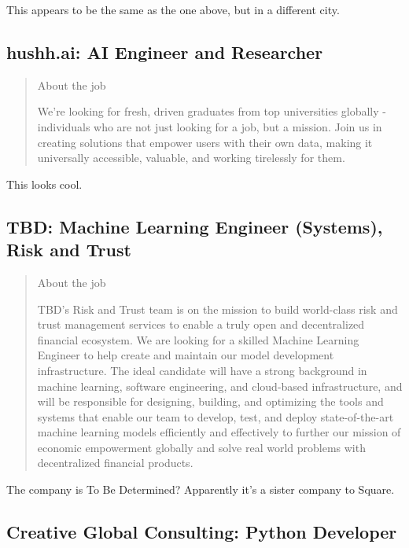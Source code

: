 \documentclass[
	letterpaper, %
	12pt, %
]{CSSullivanBusinessReport}
\begin{document}
This appears to be the same as the one above, but in a different city. 


\subsection[hushh.ai]{hushh.ai: AI Engineer and Researcher}

\begin{quote}
	About the job
	
	We're looking for fresh, driven graduates from top universities globally - individuals who are not just looking for a job, but a mission. Join us in creating solutions that empower users with their own data, making it universally accessible, valuable, and working tirelessly for them.

\end{quote}

This looks cool.


\subsection[TBD]{TBD: Machine Learning Engineer (Systems), Risk and Trust}

\begin{quote}
	About the job
	
	TBD's Risk and Trust team is on the mission to build world-class risk and trust management services to enable a truly open and decentralized financial ecosystem. We are looking for a skilled Machine Learning Engineer to help create and maintain our model development infrastructure. The ideal candidate will have a strong background in machine learning, software engineering, and cloud-based infrastructure, and will be responsible for designing, building, and optimizing the tools and systems that enable our team to develop, test, and deploy state-of-the-art machine learning models efficiently and effectively to further our mission of economic empowerment globally and solve real world problems with decentralized financial products.

\end{quote}

The company is To Be Determined? Apparently it's a sister company to Square. 


\subsection[Creative Global Consulting]{Creative Global Consulting: Python Developer}
\end{document}
